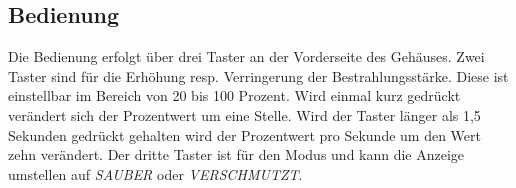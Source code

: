 \subsection{Bedienung}
Die Bedienung erfolgt über drei Taster an der Vorderseite des Gehäuses. Zwei Taster sind für die Erhöhung resp. Verringerung der Bestrahlungsstärke. Diese ist einstellbar im Bereich von 20 bis 100 Prozent. Wird einmal kurz gedrückt verändert sich der Prozentwert um eine Stelle. Wird der Taster länger als 1,5 Sekunden gedrückt gehalten wird der Prozentwert pro Sekunde um den Wert zehn verändert. Der dritte Taster ist für den Modus und kann die Anzeige umstellen auf \textit{SAUBER} oder \textit{VERSCHMUTZT}.